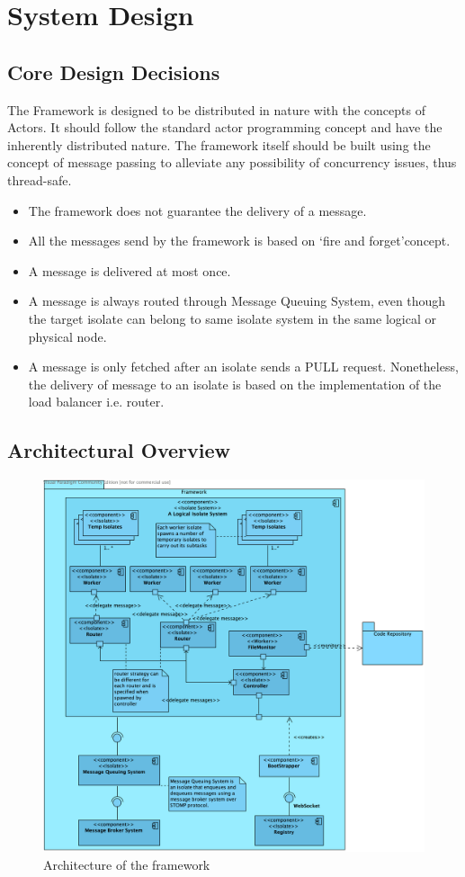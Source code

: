 \chapter{System Design}\label{chapter:general_design_decisions}

\section{Core Design Decisions}
The Framework is designed to be distributed in nature with the concepts of Actors. It should follow the standard actor programming concept and have the inherently distributed nature. The framework itself should be built using the concept of message passing to alleviate any possibility of concurrency issues, thus thread-safe.
\begin{itemize}
  \item The framework does not guarantee the delivery of a message.
  \item All the messages send by the framework is based on ‘fire and forget’concept.
  \item A message is delivered at most once.
  \item A message is always routed through Message Queuing System, even though the target isolate can belong to same isolate system in the same logical or physical node.
  \item A message is only fetched after an isolate sends a PULL request. Nonetheless, the delivery of message to an isolate is based on the implementation of the load balancer \textendash{} i.e. router.
\end{itemize}

\section{Architectural Overview}
\begin{figure}[H]
  \centering
  \includegraphics[width=1\textwidth]{figures/componentDiagram}
  \caption[architecture]{Architecture of the framework}
\end{figure}
